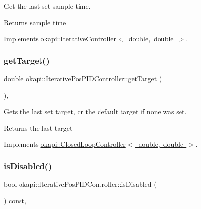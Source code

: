 Get the last set sample time.

\begin{DoxyReturn}{Returns}
sample time 
\end{DoxyReturn}


Implements \mbox{\hyperlink{classokapi_1_1IterativeController_a48cd86626af7036db4f36b4124df4f98}{okapi\+::\+Iterative\+Controller$<$ double, double $>$}}.

\mbox{\label{classokapi_1_1IterativePosPIDController_a1c4c3a54b616e4250e65a88b0cb12276}} 
\subsubsection{\texorpdfstring{getTarget()}{getTarget()}}
{\footnotesize\ttfamily double okapi\+::\+Iterative\+Pos\+P\+I\+D\+Controller\+::get\+Target (\begin{DoxyParamCaption}{ }\end{DoxyParamCaption})\hspace{0.3cm}{\ttfamily [override]}, {\ttfamily [virtual]}}

Gets the last set target, or the default target if none was set.

\begin{DoxyReturn}{Returns}
the last target 
\end{DoxyReturn}


Implements \mbox{\hyperlink{classokapi_1_1ClosedLoopController_a22012bedbfaff6e5a3a508f274ec2497}{okapi\+::\+Closed\+Loop\+Controller$<$ double, double $>$}}.

\mbox{\label{classokapi_1_1IterativePosPIDController_a8800531c198ae47c0e7b602db2dd10d3}} 
\subsubsection{\texorpdfstring{isDisabled()}{isDisabled()}}
{\footnotesize\ttfamily bool okapi\+::\+Iterative\+Pos\+P\+I\+D\+Controller\+::is\+Disabled (\begin{DoxyParamCaption}{ }\end{DoxyParamCaption}) const\hspace{0.3cm}{\ttfamily [override]}, {\ttfamily [virtual]}}

